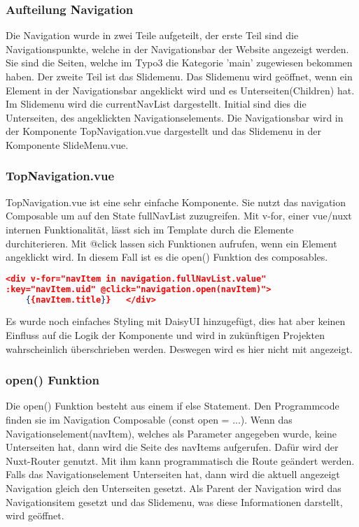 \subsubsection{Aufteilung Navigation}
\label{sec:Aufteilung Navigation}

Die Navigation wurde in zwei Teile aufgeteilt, der erste Teil sind die Navigationspunkte, welche in der Navigationsbar der Website angezeigt werden. Sie sind die Seiten, welche im Typo3 die Kategorie 'main' zugewiesen bekommen haben. Der zweite Teil ist das Slidemenu. Das Slidemenu wird geöffnet, wenn ein Element in der Navigationsbar angeklickt wird und es Unterseiten(Children) hat. Im Slidemenu wird die currentNavList dargestellt. Initial sind dies die Unterseiten, des angeklickten Navigationselements. Die Navigationsbar wird in der Komponente TopNavigation.vue dargestellt und das Slidemenu in der Komponente SlideMenu.vue.

\subsubsection{TopNavigation.vue}
\label{sec:TopNavigation.vue}

TopNavigation.vue ist eine sehr einfache Komponente. Sie nutzt das navigation Composable um auf den State fullNavList zuzugreifen. Mit v-for, einer vue/nuxt internen Funktionalität, lässt sich im Template durch die Elemente durchiterieren. Mit @click lassen sich Funktionen aufrufen, wenn ein Element angeklickt wird. In diesem Fall ist es die open() Funktion des composables.
\begin{lstlisting}[language=json,firstnumber=1]
<div v-for="navItem in navigation.fullNavList.value" 
:key="navItem.uid" @click="navigation.open(navItem)">
	{{navItem.title}}	</div>
\end{lstlisting}
Es wurde noch einfaches Styling mit DaisyUI hinzugefügt, dies hat aber keinen Einfluss auf die Logik der Komponente und wird in zukünftigen Projekten wahrscheinlich überschrieben werden. Deswegen wird es hier nicht mit angezeigt.

\subsubsection{open() Funktion}
\label{sec:open() Funktion}

Die open() Funktion besteht aus einem if else Statement. Den Programmcode finden sie im Navigation Composable  (const open = ...). Wenn das Navigationselement(navItem), welches als Parameter angegeben wurde, keine Unterseiten hat, dann wird die Seite des navItems aufgerufen. Dafür wird der Nuxt-Router genutzt. Mit ihm kann programmatisch die Route geändert werden. Falls das Navigationselement Unterseiten hat, dann wird die aktuell angezeigt Navigation gleich den Unterseiten gesetzt. Als Parent der Navigation wird das Navigationsitem gesetzt und das Slidemenu, was diese Informationen darstellt, wird geöffnet.

